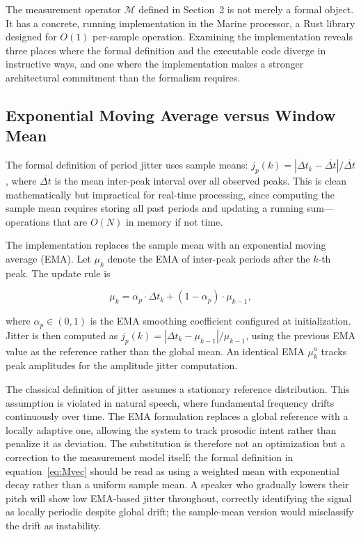 \documentclass[12pt, a4paper]{article}
\begin{document}
The measurement operator $\mathcal{M}$ defined in Section~2 is not merely a formal object. It has a concrete, running implementation in the Marine processor, a Rust library designed for $O(1)$ per-sample operation. Examining the implementation reveals three places where the formal definition and the executable code diverge in instructive ways, and one where the implementation makes a stronger architectural commitment than the formalism requires.

\subsection{Exponential Moving Average versus Window Mean}

The formal definition of period jitter uses sample means: $j_p(k) = |\Delta t_k - \overline{\Delta t}| / \overline{\Delta t}$, where $\overline{\Delta t}$ is the mean inter-peak interval over all observed peaks. This is clean mathematically but impractical for real-time processing, since computing the sample mean requires storing all past periods and updating a running sum---operations that are $O(N)$ in memory if not time.

The implementation replaces the sample mean with an exponential moving average (EMA). Let $\mu_k$ denote the EMA of inter-peak periods after the $k$-th peak. The update rule is

\begin{equation}
\mu_k = \alpha_p \cdot \Delta t_k + (1 - \alpha_p) \cdot \mu_{k-1},
\label{eq:ema}
\end{equation}

where $\alpha_p \in (0,1)$ is the EMA smoothing coefficient configured at initialization. Jitter is then computed as $j_p(k) = |\Delta t_k - \mu_{k-1}| / \mu_{k-1}$, using the previous EMA value as the reference rather than the global mean. An identical EMA $\mu^a_k$ tracks peak amplitudes for the amplitude jitter computation.

The classical definition of jitter assumes a stationary reference distribution. This assumption is violated in natural speech, where fundamental frequency drifts continuously over time. The EMA formulation replaces a global reference with a locally adaptive one, allowing the system to track prosodic intent rather than penalize it as deviation. The substitution is therefore not an optimization but a correction to the measurement model itself: the formal definition in equation~\eqref{eq:Mvec} should be read as using a weighted mean with exponential decay rather than a uniform sample mean. A speaker who gradually lowers their pitch will show low EMA-based jitter throughout, correctly identifying the signal as locally periodic despite global drift; the sample-mean version would misclassify the drift as instability.
\end{document}
